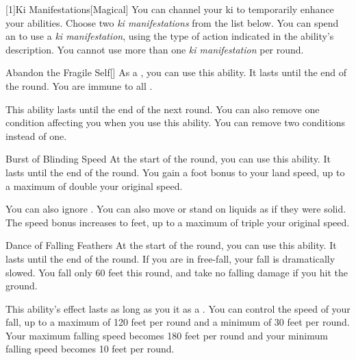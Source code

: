         [1]{Ki Manifestations}[Magical]
        You can channel your ki to temporarily enhance your abilities.
        Choose two \textit{ki manifestations} from the list below.
        You can spend an  to use a \textit{ki manifestation}, using the type of action indicated in the ability's description.
        You cannot use more than one \textit{ki manifestation} per round.
        {
            \begin{ability}{Abandon the Fragile Self}[]
                As a , you can use this ability.
                It lasts until the end of the round.
                You are immune to all .

                \rankline
                 This ability lasts until the end of the next round.
                 You can also remove one condition affecting you when you use this ability.
                 You can remove two conditions instead of one.
            \end{ability}

            \begin{ability}{Burst of Blinding Speed}
                At the start of the round, you can use this ability.
                It lasts until the end of the round.
                You gain a  foot bonus to your land speed, up to a maximum of double your original speed.

                \rankline
                 You can also ignore .
                 You can also move or stand on liquids as if they were solid.
                 The speed bonus increases to  feet, up to a maximum of triple your original speed.
            \end{ability}

            \begin{ability}{Dance of Falling Feathers}
                At the start of the round, you can use this ability.
                It lasts until the end of the round.
                If you are in free-fall, your fall is dramatically slowed.
                You fall only 60 feet this round, and take no falling damage if you hit the ground.

                \rankline
                 This ability's effect lasts as long as you  it as a .
                 You can control the speed of your fall, up to a maximum of 120 feet per round and a minimum of 30 feet per round.
                 Your maximum falling speed becomes 180 feet per round and your minimum falling speed becomes 10 feet per round.
            \end{ability}

}
